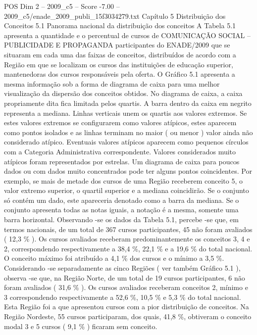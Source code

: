 \begin{textsample}{POS Dim 2 – 2009\_c5 – Score -7.00 – 2009\_c5/enade\_2009\_publi\_15f3034279.txt}  \label{ex:f2_pos_415}
Capítulo 5 Distribuição dos Conceitos 5.1 Panorama nacional da distribuição dos conceitos A Tabela 5.1 apresenta a quantidade e o percentual de cursos de COMUNICAÇÃO SOCIAL – PUBLICIDADE E PROPAGANDA participantes do ENADE/2009 que se situaram em cada uma das faixas de conceitos, distribuídos de acordo com a Região em que se localizam os cursos das instituições de educação superior, mantenedoras dos cursos responsáveis pela oferta.
O Gráfico 5.1 apresenta a mesma informação sob a forma de diagrama de caixa para uma melhor visualização da dispersão dos conceitos obtidos.
No diagrama de caixa, a caixa propriamente dita fica limitada pelos quartis.
A barra dentro da caixa em negrito representa a mediana.
Linhas verticais unem os quartis aos valores extremos.
Se estes valores extremos se configurarem como valores atípicos, estes aparecem como pontos isolados e as linhas terminam no maior ( ou menor ) valor ainda não considerado atípico.
Eventuais valores atípicos aparecem como pequenos círculos com a Categoria Administrativa correspondente.
Valores considerados muito atípicos foram representados por estrelas.
Um diagrama de caixa para poucos dados ou com dados muito concentrados pode ter alguns pontos coincidentes.
Por exemplo, se mais de metade dos cursos de uma Região receberem conceito 5, o valor extremo superior, o quartil superior e a mediana coincidirão.
Se o conjunto só contém um dado, este apareceria denotado como a barra da mediana.
Se o conjunto apresenta todas as notas iguais, a notação é a mesma, somente uma barra horizontal.
Observando -se os dados da Tabela 5.1, percebe -se que, em termos nacionais, de um total de 367 cursos participantes, 45 não foram avaliados ( 12,3 \% ).
Os cursos avaliados receberam predominantemente os conceitos 3, 4 e 2, correspondendo respectivamente a 38,4 \%, 22,1 \% e a 19,6 \% do total nacional.
O conceito máximo foi atribuído a 4,1 \% dos cursos e o mínimo a 3,5 \%.
Considerando -se separadamente as cinco Regiões ( ver também Gráfico 5.1 ), observa -se que, na Região Norte, de um total de 19 cursos participantes, 6 não foram avaliados ( 31,6 \% ).
Os cursos avaliados receberam conceitos 2, mínimo e 3 correspondendo respectivamente a 52,6 \%, 10,5 \% e 5,3 \% do total nacional.
Esta Região foi a que apresentou cursos com a pior distribuição de conceitos.
Na Região Nordeste, 55 cursos participaram, dos quais, 41,8 \%, obtiveram o conceito modal 3 e 5 cursos ( 9,1 \% ) ficaram sem conceito.

\end{textsample}
